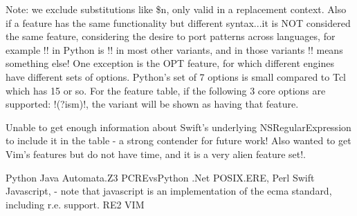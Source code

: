 Note: we exclude substitutions like \$n, only valid in a replacement context.  Also if a feature has the same functionality but different syntax...it is NOT considered the same feature, considering the desire to port patterns across languages, for example \cverb!\Z! in Python is \cverb!\z! in most other variants, and in those variants \cverb!\Z! means something else!  One exception is the OPT feature, for which different engines have different sets of options.  Python's set of 7 options is small compared to Tcl which has 15 or so.  For the feature table, if the following 3 core options are supported: \cverb!(?ism)!, the variant will be shown as having that feature.

Unable to get enough information about Swift's underlying NSRegularExpression to include it in the table - a strong contender for future work!  Also wanted to get Vim's features but do not have time, and it is a very alien feature set!.

% 


Python
Java
Automata.Z3
PCREvsPython
.Net
POSIX.ERE,
Perl
Swift
Javascript,
- note that javascript is an implementation of the ecma standard, including r.e. support.
RE2
VIM

